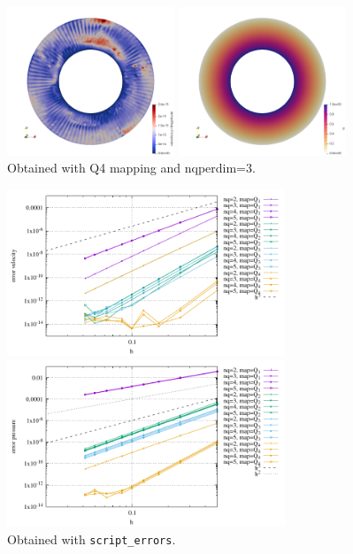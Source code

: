 \begin{center}
\includegraphics[width=5cm]{python_codes/fieldstone_152/results/exp1/vel}
\includegraphics[width=5cm]{python_codes/fieldstone_152/results/exp1/press}\\
{\captionfont Obtained with Q4 mapping and nqperdim=3.}
\end{center}

\begin{center}
\includegraphics[width=8.3cm]{python_codes/fieldstone_152/results/exp1/errv}
\includegraphics[width=8.3cm]{python_codes/fieldstone_152/results/exp1/errp}\\
{\captionfont Obtained with {\tt script\_errors}.}
\end{center}

